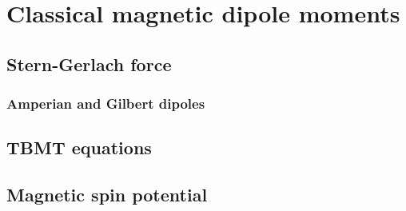 \chapter{Classical magnetic dipole moments}
    \section{Stern-Gerlach force}
        \subsection{Amperian and Gilbert dipoles}
    \section{TBMT equations}
    \section{Magnetic spin potential}
